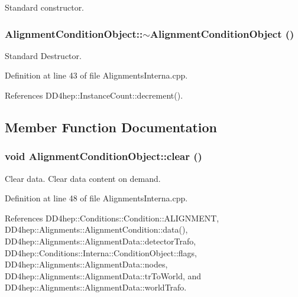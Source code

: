 Standard constructor. \hypertarget{class_d_d4hep_1_1_alignments_1_1_interna_1_1_alignment_condition_object_abbec903201eccc7d7ff725c6b573aaa7}{
\subsubsection[{$\sim$AlignmentConditionObject}]{\setlength{\rightskip}{0pt plus 5cm}AlignmentConditionObject::$\sim$AlignmentConditionObject ()}}
\label{class_d_d4hep_1_1_alignments_1_1_interna_1_1_alignment_condition_object_abbec903201eccc7d7ff725c6b573aaa7}


Standard Destructor. 

Definition at line 43 of file AlignmentsInterna.cpp.

References DD4hep::InstanceCount::decrement().

\subsection{Member Function Documentation}
\hypertarget{class_d_d4hep_1_1_alignments_1_1_interna_1_1_alignment_condition_object_a8290f82fe5e45264993a475a7f532518}{
\subsubsection[{clear}]{\setlength{\rightskip}{0pt plus 5cm}void AlignmentConditionObject::clear ()}}
\label{class_d_d4hep_1_1_alignments_1_1_interna_1_1_alignment_condition_object_a8290f82fe5e45264993a475a7f532518}


Clear data. Clear data content on demand. 

Definition at line 48 of file AlignmentsInterna.cpp.

References DD4hep::Conditions::Condition::ALIGNMENT, DD4hep::Alignments::AlignmentCondition::data(), DD4hep::Alignments::AlignmentData::detectorTrafo, DD4hep::Conditions::Interna::ConditionObject::flags, DD4hep::Alignments::AlignmentData::nodes, DD4hep::Alignments::AlignmentData::trToWorld, and DD4hep::Alignments::AlignmentData::worldTrafo.

